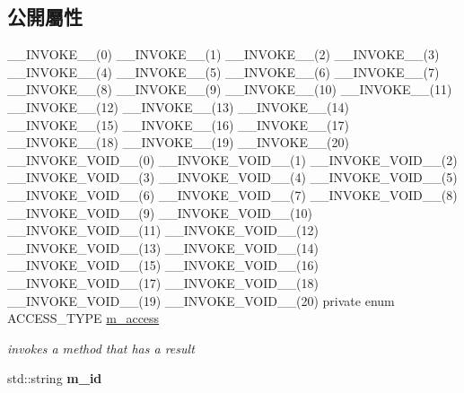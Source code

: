 \subsection*{公開屬性}
\begin{DoxyCompactItemize}
\item 
\+\_\+\+\_\+\+I\+N\+V\+O\+K\+E\+\_\+\+\_\+(0) \+\_\+\+\_\+\+I\+N\+V\+O\+K\+E\+\_\+\+\_\+(1) \+\_\+\+\_\+\+I\+N\+V\+O\+K\+E\+\_\+\+\_\+(2) \+\_\+\+\_\+\+I\+N\+V\+O\+K\+E\+\_\+\+\_\+(3) \+\_\+\+\_\+\+I\+N\+V\+O\+K\+E\+\_\+\+\_\+(4) \+\_\+\+\_\+\+I\+N\+V\+O\+K\+E\+\_\+\+\_\+(5) \+\_\+\+\_\+\+I\+N\+V\+O\+K\+E\+\_\+\+\_\+(6) \+\_\+\+\_\+\+I\+N\+V\+O\+K\+E\+\_\+\+\_\+(7) \+\_\+\+\_\+\+I\+N\+V\+O\+K\+E\+\_\+\+\_\+(8) \+\_\+\+\_\+\+I\+N\+V\+O\+K\+E\+\_\+\+\_\+(9) \+\_\+\+\_\+\+I\+N\+V\+O\+K\+E\+\_\+\+\_\+(10) \+\_\+\+\_\+\+I\+N\+V\+O\+K\+E\+\_\+\+\_\+(11) \+\_\+\+\_\+\+I\+N\+V\+O\+K\+E\+\_\+\+\_\+(12) \+\_\+\+\_\+\+I\+N\+V\+O\+K\+E\+\_\+\+\_\+(13) \+\_\+\+\_\+\+I\+N\+V\+O\+K\+E\+\_\+\+\_\+(14) \+\_\+\+\_\+\+I\+N\+V\+O\+K\+E\+\_\+\+\_\+(15) \+\_\+\+\_\+\+I\+N\+V\+O\+K\+E\+\_\+\+\_\+(16) \+\_\+\+\_\+\+I\+N\+V\+O\+K\+E\+\_\+\+\_\+(17) \+\_\+\+\_\+\+I\+N\+V\+O\+K\+E\+\_\+\+\_\+(18) \+\_\+\+\_\+\+I\+N\+V\+O\+K\+E\+\_\+\+\_\+(19) \+\_\+\+\_\+\+I\+N\+V\+O\+K\+E\+\_\+\+\_\+(20) \+\_\+\+\_\+\+I\+N\+V\+O\+K\+E\+\_\+\+V\+O\+I\+D\+\_\+\+\_\+(0) \+\_\+\+\_\+\+I\+N\+V\+O\+K\+E\+\_\+\+V\+O\+I\+D\+\_\+\+\_\+(1) \+\_\+\+\_\+\+I\+N\+V\+O\+K\+E\+\_\+\+V\+O\+I\+D\+\_\+\+\_\+(2) \+\_\+\+\_\+\+I\+N\+V\+O\+K\+E\+\_\+\+V\+O\+I\+D\+\_\+\+\_\+(3) \+\_\+\+\_\+\+I\+N\+V\+O\+K\+E\+\_\+\+V\+O\+I\+D\+\_\+\+\_\+(4) \+\_\+\+\_\+\+I\+N\+V\+O\+K\+E\+\_\+\+V\+O\+I\+D\+\_\+\+\_\+(5) \+\_\+\+\_\+\+I\+N\+V\+O\+K\+E\+\_\+\+V\+O\+I\+D\+\_\+\+\_\+(6) \+\_\+\+\_\+\+I\+N\+V\+O\+K\+E\+\_\+\+V\+O\+I\+D\+\_\+\+\_\+(7) \+\_\+\+\_\+\+I\+N\+V\+O\+K\+E\+\_\+\+V\+O\+I\+D\+\_\+\+\_\+(8) \+\_\+\+\_\+\+I\+N\+V\+O\+K\+E\+\_\+\+V\+O\+I\+D\+\_\+\+\_\+(9) \+\_\+\+\_\+\+I\+N\+V\+O\+K\+E\+\_\+\+V\+O\+I\+D\+\_\+\+\_\+(10) \+\_\+\+\_\+\+I\+N\+V\+O\+K\+E\+\_\+\+V\+O\+I\+D\+\_\+\+\_\+(11) \+\_\+\+\_\+\+I\+N\+V\+O\+K\+E\+\_\+\+V\+O\+I\+D\+\_\+\+\_\+(12) \+\_\+\+\_\+\+I\+N\+V\+O\+K\+E\+\_\+\+V\+O\+I\+D\+\_\+\+\_\+(13) \+\_\+\+\_\+\+I\+N\+V\+O\+K\+E\+\_\+\+V\+O\+I\+D\+\_\+\+\_\+(14) \+\_\+\+\_\+\+I\+N\+V\+O\+K\+E\+\_\+\+V\+O\+I\+D\+\_\+\+\_\+(15) \+\_\+\+\_\+\+I\+N\+V\+O\+K\+E\+\_\+\+V\+O\+I\+D\+\_\+\+\_\+(16) \+\_\+\+\_\+\+I\+N\+V\+O\+K\+E\+\_\+\+V\+O\+I\+D\+\_\+\+\_\+(17) \+\_\+\+\_\+\+I\+N\+V\+O\+K\+E\+\_\+\+V\+O\+I\+D\+\_\+\+\_\+(18) \+\_\+\+\_\+\+I\+N\+V\+O\+K\+E\+\_\+\+V\+O\+I\+D\+\_\+\+\_\+(19) \+\_\+\+\_\+\+I\+N\+V\+O\+K\+E\+\_\+\+V\+O\+I\+D\+\_\+\+\_\+(20) private enum A\+C\+C\+E\+S\+S\+\_\+\+T\+Y\+PE \hyperlink{classagm_1_1reflection_1_1_method_desc_a565ccc7748324e56d3628feeed2a8b4d}{m\+\_\+access}
\begin{DoxyCompactList}\small\item\em invokes a method that has a result \end{DoxyCompactList}\item 
std\+::string {\bfseries m\+\_\+id}\hypertarget{classagm_1_1reflection_1_1_method_desc_a46d6154ef83bc0f090d21cc4fc41f522}{}\label{classagm_1_1reflection_1_1_method_desc_a46d6154ef83bc0f090d21cc4fc41f522}


\end{DoxyCompactItemize}
